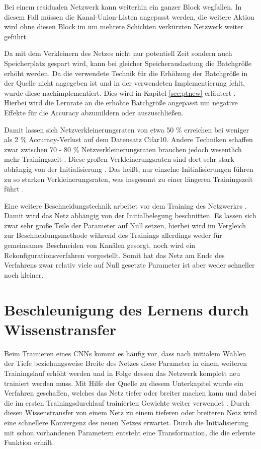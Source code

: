 Bei einem residualen Netzwerk kann weiterhin ein ganzer Block wegfallen. In diesem Fall müssen die Kanal-Union-Listen angepasst werden, die weitere Aktion wird ohne diesen Block im um mehrere Schichten verkürzten Netzwerk weiter geführt


Da mit dem Verkleinern des Netzes nicht nur potentiell Zeit sondern auch Speicherplatz gespart wird, kann bei gleicher Speicherauslastung die Batchgröße erhöht werden. Da die verwendete Technik für die Erhöhung der Batchgröße in der Quelle nicht angegeben ist und in der verwendeten Implementierung fehlt, wurde diese nachimplementiert. Dies wird in Kapitel \ref{sec:ptnew} erläutert \cite{ptImpl}. Hierbei wird die Lernrate an die erhöhte Batchgröße angepasst um negative Effekte für die Accuracy abzumildern oder auszuschließen. 

Damit lassen sich Netzverkleinerungsraten von etwa 50 \% erreichen bei weniger als 2 \% Accuracy-Verlust auf dem Datensatz Cifar10. Andere Techniken schaffen zwar zwischen 70 - 80 \% Netzverkleinerungsraten brauchen jedoch wesentlich mehr Trainingszeit \cite{lottery}. Diese großen Verkleinerungsraten sind dort sehr stark abhängig von der Initialisierung \cite{lottery}. Das heißt, nur einzelne Initialisierungen führen zu so starken Verkleinerungsraten, was insgesamt zu einer längeren Trainingszeit führt \cite{lottery}. 


Eine weitere Beschneidungstechnik arbeitet vor dem Training des Netzwerkes \cite{snyc}. Damit wird das Netz abhängig von der Initialbelegung beschnitten. Es lassen sich zwar sehr große Teile der Parameter auf Null setzen, hierbei wird im Vergleich zur Beschneidungsmethode während des Trainings allerdings weder für gemeinsames Beschneiden von Kanälen gesorgt, noch wird ein Rekonfigurationsverfahren vorgestellt. Somit hat das Netz am Ende des Verfahrens zwar relativ viele auf Null gesetzte Parameter ist aber weder schneller noch kleiner.


\section{Beschleunigung des Lernens durch Wissenstransfer}
\label{sec:net2net}
Beim Trainieren eines CNNs kommt es häufig vor, dass nach initialem Wählen der Tiefe beziehungsweise Breite des Netzes diese Parameter in einem weiteren Trainingslauf erhöht werden und in Folge dessen das Netzwerk komplett neu trainiert werden muss. Mit Hilfe der Quelle zu diesem Unterkapitel wurde ein Verfahren geschaffen, welches das Netz tiefer oder breiter machen kann und dabei die im ersten Trainingsdurchlauf trainierten Gewichte weiter verwendet \cite{net2net}. Durch diesen Wissenstransfer von einem Netz zu einem tieferen oder breiteren Netz wird eine schnellere Konvergenz des neuen Netzes erwartet. Durch die Initialisierung mit schon vorhandenen Parametern entsteht eine Transformation, die die erlernte Funktion erhält.

